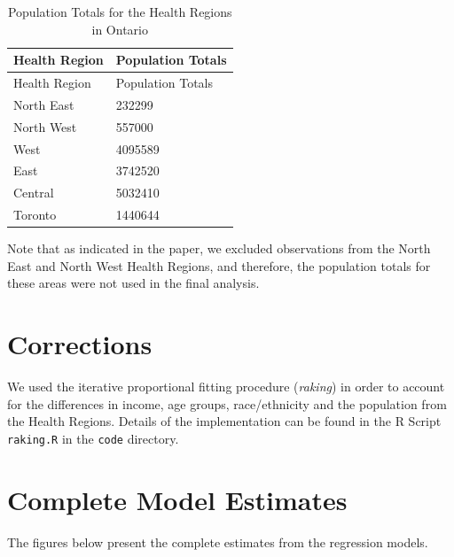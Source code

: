 \documentclass[
]{article}
\begin{document}
\hypertarget{tbl-health-regions}{}
\begin{longtable}[]{@{}ll@{}}
\caption{\label{tbl-health-regions}Population Totals for the Health
Regions in Ontario}\tabularnewline
\toprule\noalign{}
Health Region & Population Totals \\
\midrule\noalign{}
\endfirsthead
\toprule\noalign{}
Health Region & Population Totals \\
\midrule\noalign{}
\endhead
\bottomrule\noalign{}
\endlastfoot
North East & 232299 \\
North West & 557000 \\
West & 4095589 \\
East & 3742520 \\
Central & 5032410 \\
Toronto & 1440644 \\
\end{longtable}

Note that as indicated in the paper, we excluded observations from the
North East and North West Health Regions, and therefore, the population
totals for these areas were not used in the final analysis.

\hypertarget{corrections}{%
\section{Corrections}\label{corrections}}

We used the iterative proportional fitting procedure (\emph{raking}) in
order to account for the differences in income, age groups,
race/ethnicity and the population from the Health Regions. Details of
the implementation can be found in the R Script \texttt{raking.R} in the
\texttt{code} directory.

\hypertarget{complete-model-estimates}{%
\section{Complete Model Estimates}\label{complete-model-estimates}}

The figures below present the complete estimates from the regression
models.
\end{document}
